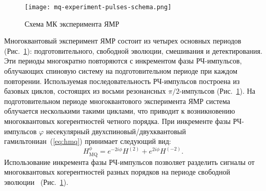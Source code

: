 %
%
%
\begin{figure}
  \centering
  \texttt{[image: mq-experiment-pulses-schema.png]}
  \caption{Схема МК эксперимента ЯМР}
  \label{fig:mq-experiment-pulses-schema}
\end{figure}

Многоквантовый эксперимент ЯМР состоит из четырех основных периодов (Рис.~\ref{fig:mq-experiment-pulses-schema}): подготовительного, свободной эволюции, смешивания и детектирования.
Эти периоды многократно повторяются с инкрементом фазы РЧ-импульсов, облучающих спиновую систему на подготовительном периоде при каждом повторении. Используемая последовательность РЧ-импульсов построена из базовых циклов, состоящих из восьми резонансных $\pi/2$-импульсов (Рис.~\ref{fig:mq-experiment-pulses-schema}).
На подготовительном периоде многоквантового эксперимента ЯМР
система облучается несколькими такими циклами,
что приводит к возникновению многоквантовых когерентностей четного порядка.
При инкременте фазы РЧ-импульсов $\varphi$ несекулярный двухспиновый/двухквантовый гамильтониан~(\ref{eq:hmq}) принимает следующий вид:
%
\begin{equation}\label{eq:hmq-phased}
    H_\mathrm{MQ}^{\phi} = e^{-2i\phi}H^{(2)} + e^{2i\phi}H^{(-2)}.
\end{equation}
%
Использование инкремента фазы РЧ-импульсов позволяет разделить сигналы от многоквантовых когерентностей разных порядков на периоде свободной эволюции~\cite{Shykind1988} (Рис.~\ref{fig:mq-experiment-pulses-schema}).

